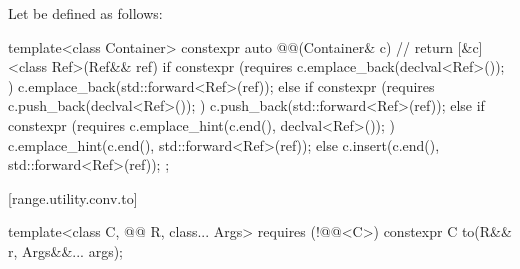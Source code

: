 \pnum
Let  be defined as follows:
\begin{codeblock}
template<class Container>
constexpr auto @@(Container& c) {                    // \expos
  return [&c]<class Ref>(Ref&& ref) {
    if constexpr (requires { c.emplace_back(declval<Ref>()); })
      c.emplace_back(std::forward<Ref>(ref));
    else if constexpr (requires { c.push_back(declval<Ref>()); })
      c.push_back(std::forward<Ref>(ref));
    else if constexpr (requires { c.emplace_hint(c.end(), declval<Ref>()); })
      c.emplace_hint(c.end(), std::forward<Ref>(ref));
    else
      c.insert(c.end(), std::forward<Ref>(ref));
  };
}
\end{codeblock}

[range.utility.conv.to]{}

%
\begin{itemdecl}
template<class C, @@ R, class... Args> requires (!@@<C>)
  constexpr C to(R&& r, Args&&... args);
\end{itemdecl}

